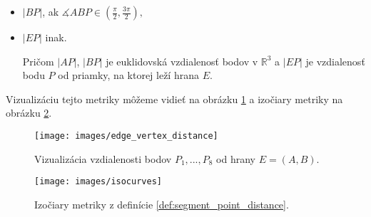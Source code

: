 \begin{enumerate}
{\begin{definition}
\begin{itemize}
            \item{
                $|BP|$, ak $\measuredangle ABP \in (\frac{\pi}{2}, \frac{3\pi}{2}),$
            }

            \item{
                $|EP|$ inak.
            }

            
            Pričom $|AP|$, $|BP|$ je euklidovská vzdialenosť bodov v $\mathbb{R}^3$ a $|EP|$ je 
            vzdialenosť bodu $P$ od priamky, na ktorej leží hrana $E$.
        \end{itemize}

        \end{definition}

        Vizualizáciu tejto metriky môžeme vidieť na obrázku \ref{obr:edge_vertex_distance} a izočiary 
        metriky na obrázku \ref{obr:isocurves}.

        \begin{figure}
            \centerline{\texttt{[image: images/edge\_vertex\_distance]}}
            \caption[Vizualizácia vzdialenosti bodov od hrany]
            {Vizualizácia vzdialenosti bodov $P_1, ..., P_8$ od hrany $E=(A,B)$.}
            \label{obr:edge_vertex_distance}
        \end{figure}

        \begin{figure}
            \centerline{\texttt{[image: images/isocurves]}}
            \caption[Izočiary metriky]
            {Izočiary metriky z definície \ref{def:segment_point_distance}.}
            \label{obr:isocurves}
        \end{figure}



}
\end{enumerate}
